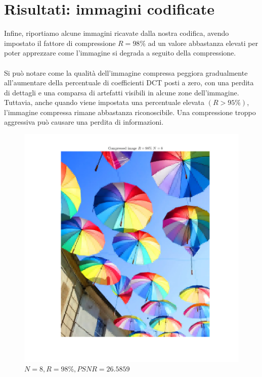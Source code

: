\section{Risultati: immagini codificate}
Infine, riportiamo alcune immagini ricavate dalla nostra codifica, avendo impostato il fattore di compressione $R=98\%$ ad un valore abbastanza elevati per poter apprezzare come l'immagine si degrada a seguito della compressione.\\\\
Si può notare come la qualità dell'immagine compressa peggiora gradualmente all'aumentare della percentuale di coefficienti DCT posti a zero, con una perdita di dettagli e una comparsa di artefatti visibili in alcune zone dell'immagine. Tuttavia, anche quando viene impostata una percentuale elevata $(R>95\%)$, l'immagine compressa rimane abbastanza riconoscibile. Una compressione troppo aggressiva può causare una perdita di informazioni.
\begin{figure}[H]
    \centering
    \includegraphics[width=\linewidth]{RIS_N8_R98.png}
    \caption{$N=8,R=98\%,PSNR=26.5859$}
    \label{fig:RIS_N8_R98}
\end{figure}
